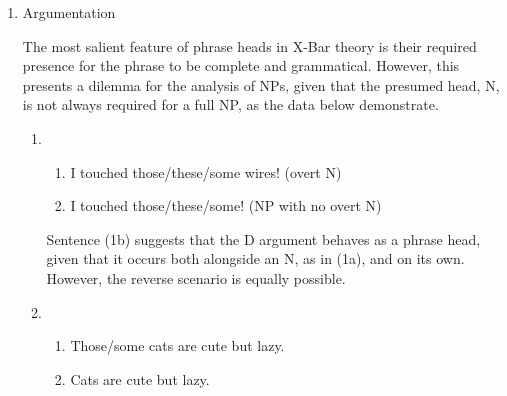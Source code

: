 \documentclass[12pt]{article}
\begin{document}
\begin{enumerate}
\begin{enumerate}
\begin{enumerate}
\item \leavevmode\vadjust{\vspace{-\baselineskip}}\newline
\noindent{}
\end{enumerate}

\item Argumentation

The most salient feature of phrase heads in X-Bar theory is their required presence for the phrase to be complete and grammatical. However, this presents a dilemma for the analysis of NPs, given that the presumed head, N, is not always required for a full NP, as the data below demonstrate.
\begin{enumerate}[label=(\arabic*)]
\item
\begin{enumerate}[label=\alph*.]
\item I touched those/these/some wires! (overt N)
\item I touched those/these/some! (NP with no overt N)
\end{enumerate}

Sentence (1b) suggests that the D argument behaves as a phrase head, given that it occurs both alongside an N, as in (1a), and on its own. However, the reverse scenario is equally possible.
\item
\begin{enumerate}[label=\alph*.]
\item Those/some cats are cute but lazy.
\item Cats are cute but lazy.
\end{enumerate}


\end{enumerate}
\end{enumerate}
\end{enumerate}
\end{document}
